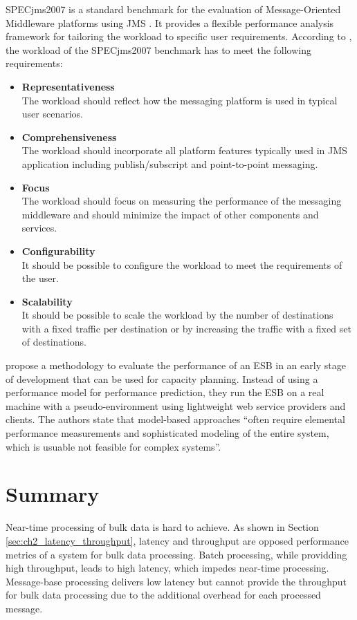 SPECjms2007 is a standard benchmark for the evaluation of Message-Oriented Middleware platforms using \ac{JMS} \citep{Sachs:2009rr}. It provides a flexible performance analysis framework for tailoring the workload to specific user requirements. According to \cite{sachs2007designing}, the workload of the SPECjms2007 benchmark has to meet the following requirements:
\begin{itemize}
	\item \textbf{Representativeness}\\
	The workload should reflect how the messaging platform is used in typical user scenarios.
	\item \textbf{Comprehensiveness}\\
	The workload should incorporate all platform features typically used in JMS application including publish/subscript and point-to-point messaging.
	\item \textbf{Focus}\\
	The workload should focus on measuring the performance of the messaging middleware and should minimize the impact of other components and services.
	\item \textbf{Configurability}\\
	It should be possible to configure the workload to meet the requirements of the user.
	\item \textbf{Scalability}\\
	It should be possible to scale the workload by the number of destinations with a fixed traffic per destination or by increasing the traffic with a fixed set of destinations.
\end{itemize}

\cite{Ueno:2006ly} propose a methodology to evaluate the performance of an ESB in an early stage of development that can be used for capacity planning. Instead of using a performance model for performance prediction, they run the ESB on a real machine with a pseudo-environment using lightweight web service providers and clients. The authors state that model-based approaches ``often require elemental performance measurements and sophisticated modeling of the entire system, which is usuable not feasible for complex systems''.


\section{Summary}\label{sec:ch4_summary}
Near-time processing of bulk data is hard to achieve. As shown in Section \ref{sec:ch2_latency_throughput}, latency and throughput are opposed performance metrics of a system for bulk data processing. Batch processing, while providding high throughput, leads to high latency, which impedes near-time processing. Message-base processing delivers low latency but cannot provide the throughput for bulk data processing due to the additional overhead for each processed message.

